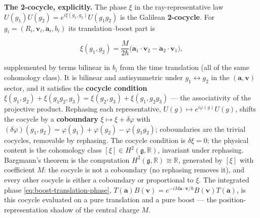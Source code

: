 \medskip\noindent\textbf{The 2-cocycle, explicitly.} The phase $\xi$ in the ray-representative law $U(g_{1})U(g_{2})=e^{i\xi(g_{1},g_{2})}U(g_{1}g_{2})$ is the Galilean \textbf{2-cocycle}. For $g_{i}=(R_{i},\bm v_{i},\bm a_{i},b_{i})$ its translation--boost part is
\begin{linenomath}
\begin{equation}
\xi(g_{1},g_{2})=\frac{M}{2\hbar}\bigl(\bm a_{1}\!\cdot\!\bm v_{2}-\bm a_{2}\!\cdot\!\bm v_{1}\bigr),
\label{eq:bargmann-cocycle}
\end{equation}
\end{linenomath}
supplemented by terms bilinear in $b_{i}$ from the time translation (all of the same cohomology class). It is bilinear and antisymmetric under $g_{1}\leftrightarrow g_{2}$ in the $(\bm a,\bm v)$ sector, and it satisfies the \textbf{cocycle condition} $\xi(g_{1},g_{2})+\xi(g_{1}g_{2},g_{3})=\xi(g_{2},g_{3})+\xi(g_{1},g_{2}g_{3})$ --- the associativity of the projective product. Rephasing each representative, $U(g)\mapsto e^{i\varphi(g)}U(g)$, shifts the cocycle by a \textbf{coboundary} $\xi\mapsto\xi+\delta\varphi$ with $(\delta\varphi)(g_{1},g_{2})=\varphi(g_{1})+\varphi(g_{2})-\varphi(g_{1}g_{2})$; coboundaries are the trivial cocycles, removable by rephasing. The cocycle condition is $\delta\xi=0$; the physical content is the cohomology class $[\xi]\in H^{2}(\mathfrak g,\mathbb R)$, invariant under rephasing. Bargmann's theorem is the computation $H^{2}(\mathfrak g,\mathbb R)\cong\mathbb R$, generated by $[\xi]$ with coefficient $M$: the cocycle is not a coboundary (no rephasing removes it), and every other cocycle is either a coboundary or proportional to $\xi$. The integrated phase \eqref{eq:boost-translation-phase}, $T(\bm a)B(\bm v)=e^{-iM\bm a\cdot\bm v/\hbar}B(\bm v)T(\bm a)$, is this cocycle evaluated on a pure translation and a pure boost --- the position-representation shadow of the central charge $M$.

